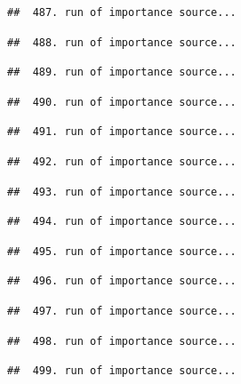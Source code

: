 \documentclass[
]{article}
\newenvironment{Shaded}{\begin{snugshade}}{\end{snugshade}}
\newcommand{\FunctionTok}[1]{\textcolor[rgb]{0.00,0.00,0.00}{#1}}
\newcommand{\NormalTok}[1]{#1}
\newcommand{\OtherTok}[1]{\textcolor[rgb]{0.56,0.35,0.01}{#1}}
\newcommand{\SpecialCharTok}[1]{\textcolor[rgb]{0.00,0.00,0.00}{#1}}
\newcommand{\StringTok}[1]{\textcolor[rgb]{0.31,0.60,0.02}{#1}}
\begin{document}
\begin{verbatim}
##  487. run of importance source...
\end{verbatim}

\begin{verbatim}
##  488. run of importance source...
\end{verbatim}

\begin{verbatim}
##  489. run of importance source...
\end{verbatim}

\begin{verbatim}
##  490. run of importance source...
\end{verbatim}

\begin{verbatim}
##  491. run of importance source...
\end{verbatim}

\begin{verbatim}
##  492. run of importance source...
\end{verbatim}

\begin{verbatim}
##  493. run of importance source...
\end{verbatim}

\begin{verbatim}
##  494. run of importance source...
\end{verbatim}

\begin{verbatim}
##  495. run of importance source...
\end{verbatim}

\begin{verbatim}
##  496. run of importance source...
\end{verbatim}

\begin{verbatim}
##  497. run of importance source...
\end{verbatim}

\begin{verbatim}
##  498. run of importance source...
\end{verbatim}

\begin{verbatim}
##  499. run of importance source...
\end{verbatim}

\begin{Shaded}
\end{Shaded}
\end{document}
